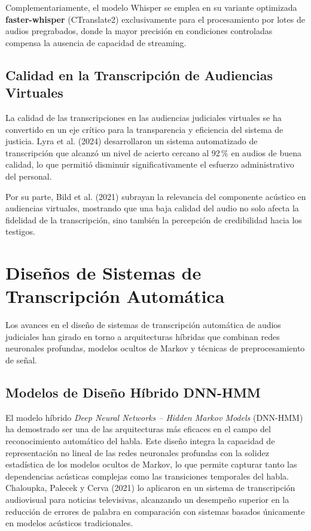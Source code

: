 \documentclass[12pt,a4paper,oneside]{report}
\begin{document}
Complementariamente, el modelo Whisper se emplea en su variante optimizada \textbf{faster-whisper} (CTranslate2) exclusivamente para el procesamiento por lotes de audios pregrabados, donde la mayor precisión en condiciones controladas compensa la ausencia de capacidad de streaming.

\subsection{Calidad en la Transcripción de Audiencias Virtuales}

La calidad de las transcripciones en las audiencias judiciales virtuales se ha convertido en un eje crítico para la transparencia y eficiencia del sistema de justicia. Lyra et al. (2024) desarrollaron un sistema automatizado de transcripción que alcanzó un nivel de acierto cercano al 92\,\% en audios de buena calidad, lo que permitió disminuir significativamente el esfuerzo administrativo del personal.

Por su parte, Bild et al. (2021) subrayan la relevancia del componente acústico en audiencias virtuales, mostrando que una baja calidad del audio no solo afecta la fidelidad de la transcripción, sino también la percepción de credibilidad hacia los testigos.

\section{Diseños de Sistemas de Transcripción Automática}

Los avances en el diseño de sistemas de transcripción automática de audios judiciales han girado en torno a arquitecturas híbridas que combinan redes neuronales profundas, modelos ocultos de Markov y técnicas de preprocesamiento de señal.

\subsection{Modelos de Diseño Híbrido DNN-HMM}

El modelo híbrido \textit{Deep Neural Networks -- Hidden Markov Models} (DNN-HMM) ha demostrado ser una de las arquitecturas más eficaces en el campo del reconocimiento automático del habla. Este diseño integra la capacidad de representación no lineal de las redes neuronales profundas con la solidez estadística de los modelos ocultos de Markov, lo que permite capturar tanto las dependencias acústicas complejas como las transiciones temporales del habla. Chaloupka, Palecek y Cerva (2021) lo aplicaron en un sistema de transcripción audiovisual para noticias televisivas, alcanzando un desempeño superior en la reducción de errores de palabra en comparación con sistemas basados únicamente en modelos acústicos tradicionales.
\end{document}
